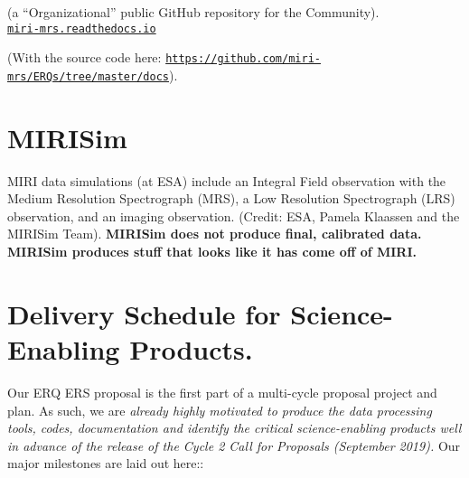 (a ``Organizational'' public GitHub repository for the Community).
\\

\href{http://miri-mrs.readthedocs.io/en/latest/}{{\tt miri-mrs.readthedocs.io}}

(With the source code here: \href{https://github.com/miri-mrs/ERQs/tree/master/docs}{{\tt https://github.com/miri-mrs/ERQs/tree/master/docs}}). \\



\section*{MIRISim}
MIRI data simulations (at ESA) include an Integral Field observation
with the Medium Resolution Spectrograph (MRS), a Low Resolution
Spectrograph (LRS) observation, and an imaging observation. (Credit:
ESA, Pamela Klaassen and the MIRISim Team).
{\bf MIRISim does not produce final, calibrated data. 
MIRISim produces stuff that looks like it has come off of MIRI.}



\iffalse
\section{Useful links}
http://astroconda.readthedocs.io/en/latest/ \\
https://www.cosmos.esa.int/web/jwst/simulations\\
https://confluence.stsci.edu/display/JWSTDADF/JWST+Data+Analysis+Development+Forum\\
https://jwst.stsci.edu/science-planning/data-analysis-toolbox\\
https://www.youtube.com/watch?v=A024z9CITZs\\
https://jwst.stsci.edu/science-planning/proposal-planning-toolbox/simulated-data\\
\fi


\section*{Delivery Schedule for Science-Enabling Products.} 
Our ERQ ERS proposal is the first part of a multi-cycle proposal
project and plan.  As such, we are {\it already highly motivated to
produce the data processing tools, codes, documentation and identify
the critical science-enabling products well in advance of the release
of the Cycle 2 Call for Proposals (September 2019).}
Our major milestones are laid out here::

